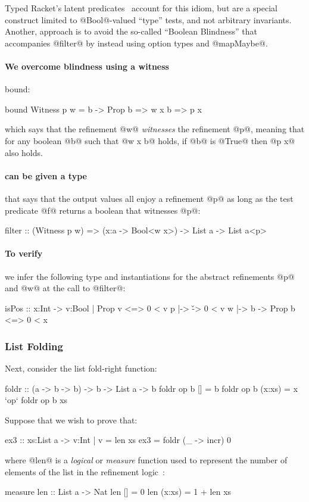 Typed Racket's latent predicates~\cite{typedracket} 
account for this idiom, but are a special construct 
limited to @Bool@-valued ``type'' tests, and not 
arbitrary invariants.
%
Another, approach is to avoid the so-called 
``Boolean Blindness'' that accompanies 
@filter@ by instead using option types 
and @mapMaybe@.

\paragraph{We overcome blindness using a witness} bound:
%
\begin{code}
   bound Witness p w = \x b -> 
     Prop b => w x b => p x
\end{code}
%
which says that the refinement @w@ \emph{witnesses} the 
refinement @p@, meaning that for any boolean @b@ such 
that @w x b@ holds, if @b@ is @True@ then @p x@ also holds. 

\paragraph{ can be given a type} that says that the output values
all enjoy a refinement @p@ as long as the test predicate @f@ returns
a boolean that witnesses @p@:
%
\begin{code}
   filter :: (Witness p w) => (x:a -> Bool<w x>) 
                           -> List a 
                           -> List a<p>
\end{code}

\paragraph{To verify } we infer the following type and 
instantiations for the abstract refinements @p@ and @w@ at the 
call to @filter@:
%
\begin{code}
    isPos :: x:Int -> {v:Bool | Prop v <=> 0 < v}
    p     |-> \v   -> 0 < v
    w     |-> \x b -> Prop b <=> 0 < x
\end{code}

\subsubsection*{List Folding}

Next, consider the list fold-right function:
%
\begin{code}
    foldr :: (a -> b -> b) -> b -> List a -> b
    foldr op b []     = b
    foldr op b (x:xs) = x `op` foldr op b xs
\end{code}
%
Suppose that we wish to prove that:
%
\begin{code}
    ex3 :: xs:List a -> {v:Int | v = len xs}
    ex3 = foldr (\_ -> incr) 0
\end{code}
%
where @len@ is a \emph{logical} or \emph{measure} 
function used to represent the number of elements of
the list in the refinement logic~\cite{LiquidICFP14}:
%
\begin{code}
    measure len :: List a -> Nat
    len []      = 0
    len (x:xs)  = 1 + len xs
\end{code}

